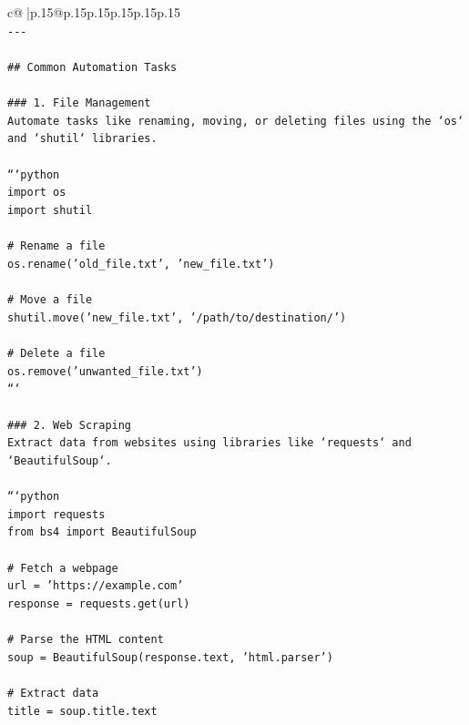\documentclass{article}
\begin{document}
{\begin{supertabular}{c@{$\;$}|p{.15\linewidth}@{}p{.15\linewidth}p{.15\linewidth}p{.15\linewidth}p{.15\linewidth}p{.15\linewidth}}
{{{\\ 
\texttt{{-}{-}{-}} \\
\\ 
\texttt{\#\# Common Automation Tasks} \\
\\ 
\texttt{\#\#\# 1. File Management} \\
\texttt{Automate tasks like renaming, moving, or deleting files using the `os` and `shutil` libraries.} \\
\\ 
\texttt{```python} \\
\texttt{import os} \\
\texttt{import shutil} \\
\\ 
\texttt{\# Rename a file} \\
\texttt{os.rename('old\_file.txt', 'new\_file.txt')} \\
\\ 
\texttt{\# Move a file} \\
\texttt{shutil.move('new\_file.txt', '/path/to/destination/')} \\
\\ 
\texttt{\# Delete a file} \\
\texttt{os.remove('unwanted\_file.txt')} \\
\texttt{```} \\
\\ 
\texttt{\#\#\# 2. Web Scraping} \\
\texttt{Extract data from websites using libraries like `requests` and `BeautifulSoup`.} \\
\\ 
\texttt{```python} \\
\texttt{import requests} \\
\texttt{from bs4 import BeautifulSoup} \\
\\ 
\texttt{\# Fetch a webpage} \\
\texttt{url = 'https://example.com'} \\
\texttt{response = requests.get(url)} \\
\\ 
\texttt{\# Parse the HTML content} \\
\texttt{soup = BeautifulSoup(response.text, 'html.parser')} \\
\\ 
\texttt{\# Extract data} \\
\texttt{title = soup.title.text} \\
}}}
\end{supertabular}}
\end{document}
